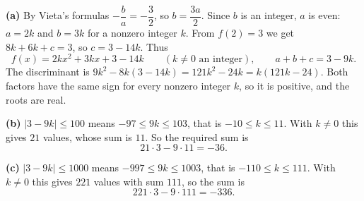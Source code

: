 \textbf{(a)} By Vieta's formulas $-\dfrac ba=-\dfrac32$, so $b=\dfrac{3a}2$. Since $b$ is an integer, $a$ is even: $a=2k$ and $b=3k$ for a nonzero integer $k$. From $f(2)=3$ we get $8k+6k+c=3$, so $c=3-14k$. Thus
\[f(x)=2kx^2+3kx+3-14k\qquad(k\ne0\text{ an integer}),\qquad a+b+c=3-9k.\]
The discriminant is $9k^2-8k(3-14k)=121k^2-24k=k(121k-24)$. Both factors have the same sign for every nonzero integer $k$, so it is positive, and the roots are real.

\textbf{(b)} $|3-9k|\le100$ means $-97\le9k\le103$, that is $-10\le k\le11$. With $k\ne0$ this gives $21$ values, whose sum is $11$. So the required sum is
\[21\cdot3-9\cdot11=\boxed{-36}.\]

\textbf{(c)} $|3-9k|\le1000$ means $-997\le9k\le1003$, that is $-110\le k\le111$. With $k\ne0$ this gives $221$ values with sum $111$, so the sum is
\[221\cdot3-9\cdot111=\boxed{-336}.\]
